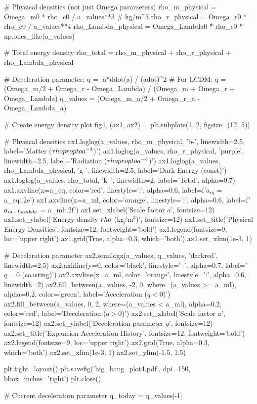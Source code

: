 \documentclass[a4paper, 11pt]{article}
\begin{document}
\begin{pycode}
# Physical densities (not just Omega parameters)
rho_m_physical = Omega_m0 * rho_c0 / a_values**3  # kg/m^3
rho_r_physical = Omega_r0 * rho_c0 / a_values**4
rho_Lambda_physical = Omega_Lambda0 * rho_c0 * np.ones_like(a_values)

# Total energy density
rho_total = rho_m_physical + rho_r_physical + rho_Lambda_physical

# Deceleration parameter: q = -a*ddot(a) / (adot)^2
# For LCDM: q = (Omega_m/2 + Omega_r - Omega_Lambda) / (Omega_m + Omega_r + Omega_Lambda)
q_values = (Omega_m_a/2 + Omega_r_a - Omega_Lambda_a)

# Create energy density plot
fig4, (ax1, ax2) = plt.subplots(1, 2, figsize=(12, 5))

# Physical densities
ax1.loglog(a_values, rho_m_physical, 'b-', linewidth=2.5, label='Matter ($\\rho \\propto a^{-3}$)')
ax1.loglog(a_values, rho_r_physical, 'purple', linewidth=2.5, label='Radiation ($\\rho \\propto a^{-4}$)')
ax1.loglog(a_values, rho_Lambda_physical, 'g-', linewidth=2.5, label='Dark Energy (const)')
ax1.loglog(a_values, rho_total, 'k--', linewidth=2, label='Total', alpha=0.7)
ax1.axvline(x=a_eq, color='red', linestyle=':', alpha=0.6, label=f'$a_{{eq}}$ = {a_eq:.2e}')
ax1.axvline(x=a_ml, color='orange', linestyle=':', alpha=0.6, label=f'$a_{{m-\\Lambda}}$ = {a_ml:.2f}')
ax1.set_xlabel('Scale factor $a$', fontsize=12)
ax1.set_ylabel('Energy density $\\rho$ (kg/m$^3$)', fontsize=12)
ax1.set_title('Physical Energy Densities', fontsize=12, fontweight='bold')
ax1.legend(fontsize=9, loc='upper right')
ax1.grid(True, alpha=0.3, which='both')
ax1.set_xlim(1e-3, 1)

# Deceleration parameter
ax2.semilogx(a_values, q_values, 'darkred', linewidth=2.5)
ax2.axhline(y=0, color='black', linestyle='--', alpha=0.7, label='$q=0$ (coasting)')
ax2.axvline(x=a_ml, color='orange', linestyle=':', alpha=0.6, linewidth=2)
ax2.fill_between(a_values, -2, 0, where=(a_values >= a_ml), alpha=0.2, color='green',
                  label='Acceleration ($q<0$)')
ax2.fill_between(a_values, 0, 2, where=(a_values < a_ml), alpha=0.2, color='red',
                  label='Deceleration ($q>0$)')
ax2.set_xlabel('Scale factor $a$', fontsize=12)
ax2.set_ylabel('Deceleration parameter $q$', fontsize=12)
ax2.set_title('Expansion Acceleration History', fontsize=12, fontweight='bold')
ax2.legend(fontsize=9, loc='upper right')
ax2.grid(True, alpha=0.3, which='both')
ax2.set_xlim(1e-3, 1)
ax2.set_ylim(-1.5, 1.5)

plt.tight_layout()
plt.savefig('big_bang_plot4.pdf', dpi=150, bbox_inches='tight')
plt.close()

# Current deceleration parameter
q_today = q_values[-1]

\end{pycode}
\end{document}
